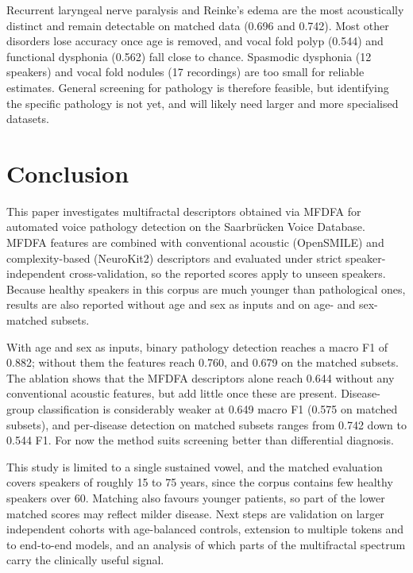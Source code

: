 \documentclass[runningheads]{llncs}
\begin{document}
  Recurrent laryngeal nerve paralysis and Reinke's edema are the most acoustically distinct and remain detectable on matched data (0.696 and 0.742). Most other disorders lose accuracy once age is removed, and vocal fold polyp (0.544) and functional dysphonia (0.562) fall close to chance. Spasmodic dysphonia (12 speakers) and vocal fold nodules (17 recordings) are too small for reliable estimates. General screening for pathology is therefore feasible, but identifying the specific pathology is not yet, and will likely need larger and more specialised datasets.


  \section{Conclusion}
  \label{sec:conclusion}

  This paper investigates multifractal descriptors obtained via MFDFA for automated voice pathology detection on the Saarbrücken Voice Database. MFDFA features are combined with conventional acoustic (OpenSMILE) and complexity-based (NeuroKit2) descriptors and evaluated under strict speaker-independent cross-validation, so the reported scores apply to unseen speakers. Because healthy speakers in this corpus are much younger than pathological ones, results are also reported without age and sex as inputs and on age- and sex-matched subsets.

  With age and sex as inputs, binary pathology detection reaches a macro F1 of 0.882; without them the features reach 0.760, and 0.679 on the matched subsets. The ablation shows that the MFDFA descriptors alone reach 0.644 without any conventional acoustic features, but add little once these are present. Disease-group classification is considerably weaker at 0.649 macro F1 (0.575 on matched subsets), and per-disease detection on matched subsets ranges from 0.742 down to 0.544 F1. For now the method suits screening better than differential diagnosis.

  This study is limited to a single sustained vowel, and the matched evaluation covers speakers of roughly 15 to 75 years, since the corpus contains few healthy speakers over 60. Matching also favours younger patients, so part of the lower matched scores may reflect milder disease. Next steps are validation on larger independent cohorts with age-balanced controls, extension to multiple tokens and to end-to-end models, and an analysis of which parts of the multifractal spectrum carry the clinically useful signal.



\end{document}

